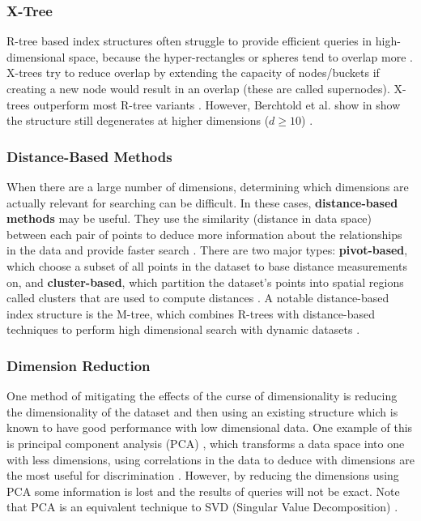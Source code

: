 \subsubsection{X-Tree}

R-tree based index structures often struggle to provide efficient queries in high-dimensional space, because the hyper-rectangles or spheres tend to overlap more \cite{pyramid-tree}. X-trees \cite{x-tree} try to reduce overlap by extending the capacity of nodes/buckets if creating a new node would result in an overlap (these are called supernodes). X-trees outperform most R-tree variants \cite{x-tree}. However, Berchtold et al. show in  \cite{pyramid-tree} show the structure still degenerates at higher dimensions ($d \geq 10$) \cite{pyramid-tree}.

\subsubsection{Distance-Based Methods}

When there are a large number of dimensions, determining which dimensions are actually relevant for searching can be difficult. In these cases, \textbf{distance-based methods} may be useful. They use the similarity (distance in data space) between each pair of points to deduce more information about the relationships in the data and provide faster search \cite{md-structures-samet}. There are two major types: \textbf{pivot-based}, which choose a subset of all points in the dataset to base distance measurements on, and \textbf{cluster-based}, which partition the dataset's points into spatial regions called clusters that are used to compute distances \cite{md-structures-samet}. A notable distance-based index structure is the M-tree, which combines R-trees with distance-based techniques to perform high dimensional search with dynamic datasets \cite{m-tree}.

\subsubsection{Dimension Reduction}

One method of mitigating the effects of the curse of dimensionality is reducing the dimensionality of the dataset and then using an existing structure which is known to have good performance with low dimensional data. One example of this is principal component analysis (PCA) \cite{pca}, which transforms a data space into one with less dimensions, using correlations in the data to deduce with dimensions are the most useful for discrimination \cite{pca}. However, by reducing the dimensions using PCA some information is lost and the results of queries will not be exact. Note that PCA is an equivalent technique to SVD (Singular Value Decomposition) \cite{md-structures-samet}.

